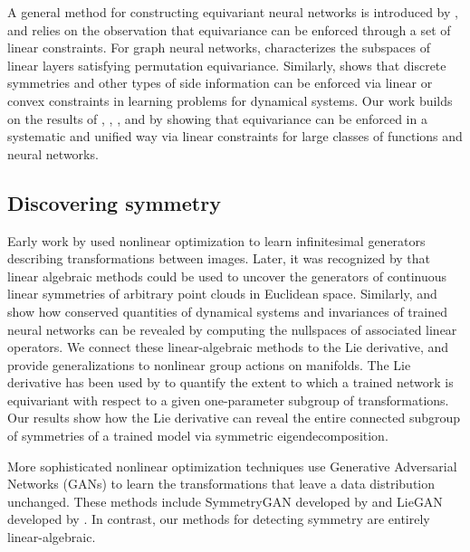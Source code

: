 \documentclass[twoside,11pt]{article}
\begin{document}
A general method for constructing equivariant neural networks is introduced by \cite{Finzi2021practical}, and relies on the observation that equivariance can be enforced through a set of linear constraints. 
For graph neural networks, \cite{maron2018invariant} characterizes the subspaces of linear layers satisfying permutation equivariance. 
Similarly, \cite{Ahmadi2020learning_short} shows that discrete symmetries and other types of side information can be enforced via linear or convex constraints in learning problems for dynamical systems.
Our work builds on the results of \cite{Finzi2021practical}, \cite{weiler20183d}, \cite{Cohen2019general}, and \cite{Ahmadi2020learning_short} by showing that equivariance can be enforced in a systematic and unified way via linear constraints for large classes of functions and neural networks.


\subsection{Discovering symmetry}
Early work by \cite{Rao1999learning, Miao2007learning} used nonlinear optimization to learn infinitesimal generators describing transformations between images. 
Later, it was recognized by \cite{Cahill2023Lie} that linear algebraic methods could be used to uncover the generators of continuous linear symmetries of arbitrary point clouds in Euclidean space. 
Similarly, \cite{Kaiser2018discovering} and \cite{Moskalev2022liegg} show how conserved quantities of dynamical systems and invariances of trained neural networks can be revealed by computing the nullspaces of associated linear operators.
We connect these linear-algebraic methods to the Lie derivative, and provide generalizations to nonlinear group actions on manifolds. 
The Lie derivative has been used by \cite{Gruver2022Lie} to quantify the extent to which a trained network is equivariant with respect to a given one-parameter subgroup of transformations.
Our results show how the Lie derivative can reveal the entire connected subgroup of symmetries of a trained model via symmetric eigendecomposition.

More sophisticated nonlinear optimization techniques use Generative Adversarial Networks (GANs) to learn the transformations that leave a data distribution unchanged. 
These methods include SymmetryGAN developed by \cite{Desai2022symmetry} and LieGAN developed by \cite{Yang2023generative}. 
In contrast, our methods for detecting symmetry are entirely linear-algebraic.
\end{document}
